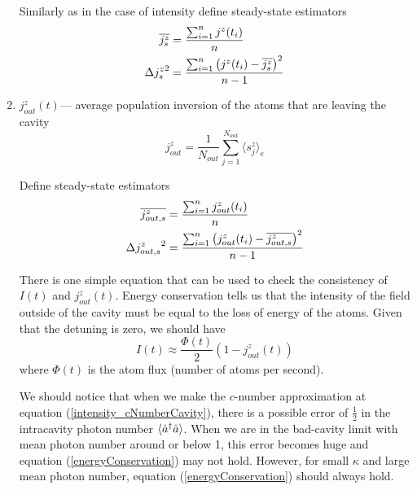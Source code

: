 \documentclass{article}
\begin{document}
\begin{enumerate}
        Similarly as in the case of intensity define steady-state estimators
    \begin{align}
    \label{estimator;jz}
        \notag \overline{j^z_s} &= \frac{\sum_{i=1}^{n} j^z(t_i)}{n}\\
               {\Delta j^z_s}^2 &= \frac{\sum_{i=1}^{n} \left(j^z(t_i)-\overline{j^z_s}\right)^2}{n-1}
    \end{align}

    \item $j^z_{out}(t)$\---- average population inversion of the atoms that are leaving the cavity
        \begin{equation}
            j^z_{out} = \frac{1}{N_{out}} \sum_{j=1}^{N_{out}}\langle s_j^z\rangle_e
        \end{equation}
        
        Define steady-state estimators
    \begin{align}
    \label{estimator;jzout}
        \notag \overline{j^z_{out,s}} &= \frac{\sum_{i=1}^{n} j^z_{out}(t_i)}{n}\\
               {\Delta j^z_{out,s}}^2 &= \frac{\sum_{i=1}^{n} \left(j^z_{out}(t_i)-\overline{j^z_{out,s}}\right)^2}{n-1}
    \end{align}
    
        There is one simple equation that can be used to check the consistency of $I(t)$ and $j^z_{out}(t)$. Energy conservation tells us that the intensity of the field outside of the cavity must be equal to the loss of energy of the atoms. Given that the detuning is zero, we should have
        \begin{equation}
            \label{energyConservation}
            I(t) \approx \frac{\Phi(t)}{2}\left(1-j^z_{out}(t)\right)
        \end{equation}
        where $\Phi(t)$ is the atom flux (number of atoms per second).
        
        We should notice that when we make the $c$-number approximation at equation (\ref{intensity_cNumberCavity}), there is a possible error of $\frac{1}{2}$ in the intracavity photon number $\langle \Hat{a}^\dagger \Hat{a}\rangle$. When we are in the bad-cavity limit with mean photon number around or below 1, this error becomes huge and equation (\ref{energyConservation}) may not hold. However, for small $\kappa$ and large mean photon number, equation (\ref{energyConservation}) should always hold.
    

\end{enumerate}
\end{document}
